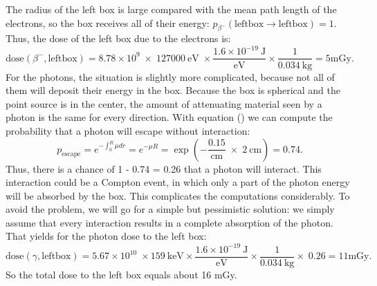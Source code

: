The radius of the left box is large compared with the mean path length
of the electrons, so the box receives all of their energy:
$p_{\beta^-}(\mbox{leftbox} \rightarrow \mbox{leftbox}) = 1$. Thus, the
dose of the left box due to the electrons is:
\begin{equation}
  \mbox{dose}(\beta^-,\mbox{leftbox}) = 8.78 \times 10^9 \; \times \; 
         127000 \ \mbox{eV} \;
    \times \frac{1.6 \times 10^{-19} \ \mbox{J}}{\mbox{eV}} \times 
          \frac{1}{0.034 \ \mbox{kg}}
      = 5 \mbox{mGy}.
\end{equation}
For the photons, the situation is slightly more complicated, because
not all of them will deposit their energy in the box. Because the box
is spherical and the point source is in the center, the amount of
attenuating material seen by a photon is the same for every direction.
With equation () we can compute the probability that
a photon will escape without interaction:
\begin{equation}
  p_{\mbox{escape}} = e^{- \int_0^R \mu dr} = e^{- \mu R} 
     = \exp(- \frac{0.15}{\mbox{cm}} \; \times \; 2 \ \mbox{cm}) = 0.74.
\end{equation}
Thus, there is a chance of 1 - 0.74 = 0.26 that a photon will interact.
This interaction could be a Compton event, in which only a part of the
photon energy will be absorbed by the box. This complicates the computations
considerably. To avoid the problem, we will go for a simple but pessimistic
solution: we simply assume that every interaction results in a complete
absorption of the photon. That yields for the photon dose to the left box:
\begin{equation}
  \mbox{dose}(\gamma, \mbox{leftbox}) 
   =  5.67 \times 10^{10} \; \times  159\ \mbox{keV} 
    \times \frac{1.6 \times 10^{-19} \ \mbox{J}}{\mbox{eV}}
    \times \frac{1}{0.034 \ \mbox{kg}} \times \; 0.26 = 11 \mbox{mGy}.
\end{equation}
So the total dose to the left box equals about 16 mGy.

